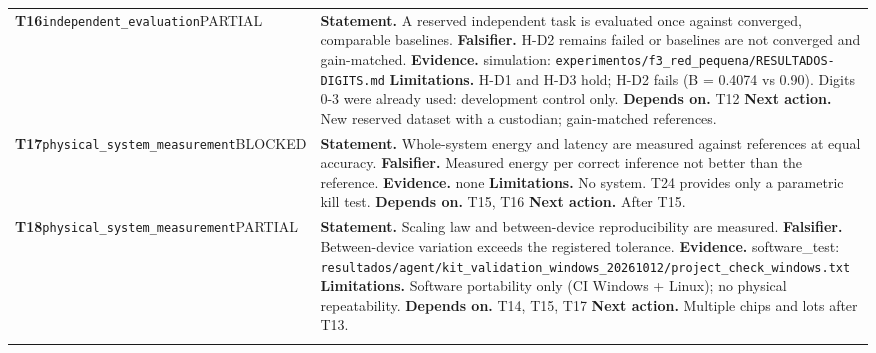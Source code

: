 \begin{longtable}{@{}>{\raggedright\arraybackslash}p{2.35cm}>{\raggedright\arraybackslash}p{13.2cm}@{}}
\textbf{T16}\newline \texttt{independent\_\allowbreak{}evaluation}\newline PARTIAL & \textbf{Statement.} A reserved independent task is evaluated once against converged, comparable baselines. \newline \textbf{Falsifier.} H-D2 remains failed or baselines are not converged and gain-matched. \newline \textbf{Evidence.} simulation: \texttt{experimentos/\allowbreak{}f3\_\allowbreak{}red\_\allowbreak{}pequena/\allowbreak{}RESULTADOS-DIGITS.md} \newline \textbf{Limitations.} H-D1 and H-D3 hold; H-D2 fails (B = 0.4074 vs 0.90). Digits 0-3 were already used: development control only. \newline \textbf{Depends on.} T12 \newline \textbf{Next action.} New reserved dataset with a custodian; gain-matched references. \\ \addlinespace[2pt]
\textbf{T17}\newline \texttt{physical\_\allowbreak{}system\_\allowbreak{}measurement}\newline BLOCKED & \textbf{Statement.} Whole-system energy and latency are measured against references at equal accuracy. \newline \textbf{Falsifier.} Measured energy per correct inference not better than the reference. \newline \textbf{Evidence.} none \newline \textbf{Limitations.} No system. T24 provides only a parametric kill test. \newline \textbf{Depends on.} T15, T16 \newline \textbf{Next action.} After T15. \\ \addlinespace[2pt]
\textbf{T18}\newline \texttt{physical\_\allowbreak{}system\_\allowbreak{}measurement}\newline PARTIAL & \textbf{Statement.} Scaling law and between-device reproducibility are measured. \newline \textbf{Falsifier.} Between-device variation exceeds the registered tolerance. \newline \textbf{Evidence.} software\_\allowbreak{}test: \texttt{resultados/\allowbreak{}agent/\allowbreak{}kit\_\allowbreak{}validation\_\allowbreak{}windows\_\allowbreak{}20261012/\allowbreak{}project\_\allowbreak{}check\_\allowbreak{}windows.txt} \newline \textbf{Limitations.} Software portability only (CI Windows + Linux); no physical repeatability. \newline \textbf{Depends on.} T14, T15, T17 \newline \textbf{Next action.} Multiple chips and lots after T13. \\ \addlinespace[2pt]

\end{longtable}
